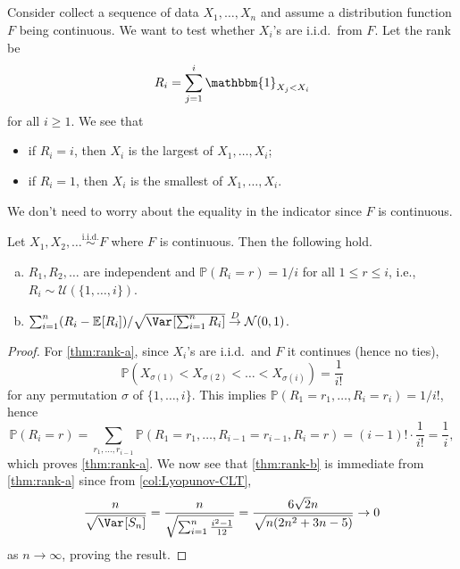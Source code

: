 \subsection{}
Consider collect a sequence of data \(X_1, \dots , X_n\) and assume a distribution function \(F\) being continuous. We want to test whether \(X_i\)'s are i.i.d.\ from \(F\). Let the rank be
\[
	R_i = \sum_{j=1}^{i} \mathbbm{1}_{X_j < X_i}
\]
for all \(i \geq 1\). We see that
\begin{itemize}
	\item if \(R_i = i\), then \(X_i\) is the largest of \(X_1, \dots , X_i\);
	\item if \(R_i = 1\), then \(X_i\) is the smallest of \(X_1, \dots , X_i\).
\end{itemize}

\begin{note}
	We don't need to worry about the equality in the indicator since \(F\) is continuous.
\end{note}

\begin{theorem}\label{thm:rank}
	Let \(X_1, X_2 , \dots \overset{\text{i.i.d.} }{\sim } F\) where \(F\) is continuous. Then the following hold.
	\begin{enumerate}[(a)]
		\item\label{thm:rank-a} \(R_1, R_2, \dots \) are independent and \(\mathbb{P} (R_i = r) = 1 / i\) for all \(1 \leq r \leq i\), i.e., \(R_i \sim \mathcal{U} (\{ 1, \dots , i \} )\).
		\item\label{thm:rank-b} \(\sum_{i=1}^{n} (R_i - \mathbb{E}_{}[R_i] ) / \sqrt{\Var_{}[\sum_{i=1}^{n} R_i] } \overset{D}{\to} \mathcal{N} (0, 1)\).
	\end{enumerate}
\end{theorem}
\begin{proof}
	For \autoref{thm:rank-a}, since \(X_i\)'s are i.i.d.\ and \(F\) it continues (hence no ties),
	\[
		\mathbb{P} (X_{\sigma (1)} < X_{\sigma (2)} < \dots < X_{\sigma (i)})
		= \frac{1}{i!}
	\]
	for any permutation \(\sigma \) of \(\{ 1, \dots , i \} \). This implies \(\mathbb{P} (R_1 = r_1, \dots , R_i = r_i) = 1 / i!\), hence
	\[
		\mathbb{P} (R_i = r)
		= \sum_{r_1, \dots , r_{i-1}} \mathbb{P} (R_1 = r_1 , \dots , R_{i-1} = r_{i-1} , R_i = r)
		= (i - 1)! \cdot \frac{1}{i!}
		= \frac{1}{i},
	\]
	which proves \autoref{thm:rank-a}. We now see that \autoref{thm:rank-b} is immediate from \autoref{thm:rank-a} since from \autoref{col:Lyopunov-CLT},
	\[
		\frac{n}{\sqrt{\Var_{}[S_n] }}
		= \frac{n}{\sqrt{\sum_{i=1}^{n} \frac{i^2 - 1}{12}}}
		= \frac{6 \sqrt{2} n}{\sqrt{n (2 n^{2} + 3 n - 5)}}
		\to 0
	\]
	as \(n \to \infty \), proving the result.
\end{proof}

